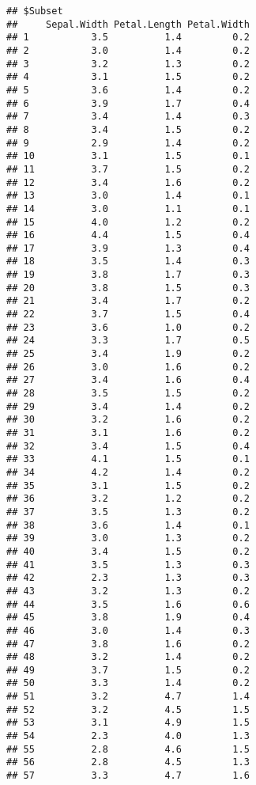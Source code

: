\documentclass[
]{article}
\begin{document}
\begin{verbatim}
## $Subset
##     Sepal.Width Petal.Length Petal.Width
## 1           3.5          1.4         0.2
## 2           3.0          1.4         0.2
## 3           3.2          1.3         0.2
## 4           3.1          1.5         0.2
## 5           3.6          1.4         0.2
## 6           3.9          1.7         0.4
## 7           3.4          1.4         0.3
## 8           3.4          1.5         0.2
## 9           2.9          1.4         0.2
## 10          3.1          1.5         0.1
## 11          3.7          1.5         0.2
## 12          3.4          1.6         0.2
## 13          3.0          1.4         0.1
## 14          3.0          1.1         0.1
## 15          4.0          1.2         0.2
## 16          4.4          1.5         0.4
## 17          3.9          1.3         0.4
## 18          3.5          1.4         0.3
## 19          3.8          1.7         0.3
## 20          3.8          1.5         0.3
## 21          3.4          1.7         0.2
## 22          3.7          1.5         0.4
## 23          3.6          1.0         0.2
## 24          3.3          1.7         0.5
## 25          3.4          1.9         0.2
## 26          3.0          1.6         0.2
## 27          3.4          1.6         0.4
## 28          3.5          1.5         0.2
## 29          3.4          1.4         0.2
## 30          3.2          1.6         0.2
## 31          3.1          1.6         0.2
## 32          3.4          1.5         0.4
## 33          4.1          1.5         0.1
## 34          4.2          1.4         0.2
## 35          3.1          1.5         0.2
## 36          3.2          1.2         0.2
## 37          3.5          1.3         0.2
## 38          3.6          1.4         0.1
## 39          3.0          1.3         0.2
## 40          3.4          1.5         0.2
## 41          3.5          1.3         0.3
## 42          2.3          1.3         0.3
## 43          3.2          1.3         0.2
## 44          3.5          1.6         0.6
## 45          3.8          1.9         0.4
## 46          3.0          1.4         0.3
## 47          3.8          1.6         0.2
## 48          3.2          1.4         0.2
## 49          3.7          1.5         0.2
## 50          3.3          1.4         0.2
## 51          3.2          4.7         1.4
## 52          3.2          4.5         1.5
## 53          3.1          4.9         1.5
## 54          2.3          4.0         1.3
## 55          2.8          4.6         1.5
## 56          2.8          4.5         1.3
## 57          3.3          4.7         1.6

\end{verbatim}
\end{document}
